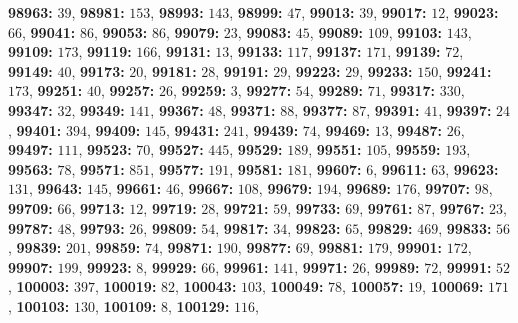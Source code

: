 \textsf{\bfseries 98963:} $39$, \textsf{\bfseries 98981:} $153$, \textsf{\bfseries 98993:} $143$, \textsf{\bfseries 98999:} $47$, \textsf{\bfseries 99013:} $39$, \textsf{\bfseries 99017:} $12$, \textsf{\bfseries 99023:} $66$, \textsf{\bfseries 99041:} $86$, \textsf{\bfseries 99053:} $86$, \textsf{\bfseries 99079:} $23$, \textsf{\bfseries 99083:} $45$, \textsf{\bfseries 99089:} $109$, \textsf{\bfseries 99103:} $143$, \textsf{\bfseries 99109:} $173$, \textsf{\bfseries 99119:} $166$, \textsf{\bfseries 99131:} $13$, \textsf{\bfseries 99133:} $117$, \textsf{\bfseries 99137:} $171$, \textsf{\bfseries 99139:} $72$, \textsf{\bfseries 99149:} $40$, \textsf{\bfseries 99173:} $20$, \textsf{\bfseries 99181:} $28$, \textsf{\bfseries 99191:} $29$, \textsf{\bfseries 99223:} $29$, \textsf{\bfseries 99233:} $150$, \textsf{\bfseries 99241:} $173$, \textsf{\bfseries 99251:} $40$, \textsf{\bfseries 99257:} $26$, \textsf{\bfseries 99259:} $3$, \textsf{\bfseries 99277:} $54$, \textsf{\bfseries 99289:} $71$, \textsf{\bfseries 99317:} $330$, \textsf{\bfseries 99347:} $32$, \textsf{\bfseries 99349:} $141$, \textsf{\bfseries 99367:} $48$, \textsf{\bfseries 99371:} $88$, \textsf{\bfseries 99377:} $87$, \textsf{\bfseries 99391:} $41$, \textsf{\bfseries 99397:} $24$, \textsf{\bfseries 99401:} $394$, \textsf{\bfseries 99409:} $145$, \textsf{\bfseries 99431:} $241$, \textsf{\bfseries 99439:} $74$, \textsf{\bfseries 99469:} $13$, \textsf{\bfseries 99487:} $26$, \textsf{\bfseries 99497:} $111$, \textsf{\bfseries 99523:} $70$, \textsf{\bfseries 99527:} $445$, \textsf{\bfseries 99529:} $189$, \textsf{\bfseries 99551:} $105$, \textsf{\bfseries 99559:} $193$, \textsf{\bfseries 99563:} $78$, \textsf{\bfseries 99571:} $851$, \textsf{\bfseries 99577:} $191$, \textsf{\bfseries 99581:} $181$, \textsf{\bfseries 99607:} $6$, \textsf{\bfseries 99611:} $63$, \textsf{\bfseries 99623:} $131$, \textsf{\bfseries 99643:} $145$, \textsf{\bfseries 99661:} $46$, \textsf{\bfseries 99667:} $108$, \textsf{\bfseries 99679:} $194$, \textsf{\bfseries 99689:} $176$, \textsf{\bfseries 99707:} $98$, \textsf{\bfseries 99709:} $66$, \textsf{\bfseries 99713:} $12$, \textsf{\bfseries 99719:} $28$, \textsf{\bfseries 99721:} $59$, \textsf{\bfseries 99733:} $69$, \textsf{\bfseries 99761:} $87$, \textsf{\bfseries 99767:} $23$, \textsf{\bfseries 99787:} $48$, \textsf{\bfseries 99793:} $26$, \textsf{\bfseries 99809:} $54$, \textsf{\bfseries 99817:} $34$, \textsf{\bfseries 99823:} $65$, \textsf{\bfseries 99829:} $469$, \textsf{\bfseries 99833:} $56$, \textsf{\bfseries 99839:} $201$, \textsf{\bfseries 99859:} $74$, \textsf{\bfseries 99871:} $190$, \textsf{\bfseries 99877:} $69$, \textsf{\bfseries 99881:} $179$, \textsf{\bfseries 99901:} $172$, \textsf{\bfseries 99907:} $199$, \textsf{\bfseries 99923:} $8$, \textsf{\bfseries 99929:} $66$, \textsf{\bfseries 99961:} $141$, \textsf{\bfseries 99971:} $26$, \textsf{\bfseries 99989:} $72$, \textsf{\bfseries 99991:} $52$, \textsf{\bfseries 100003:} $397$, \textsf{\bfseries 100019:} $82$, \textsf{\bfseries 100043:} $103$, \textsf{\bfseries 100049:} $78$, \textsf{\bfseries 100057:} $19$, \textsf{\bfseries 100069:} $171$, \textsf{\bfseries 100103:} $130$, \textsf{\bfseries 100109:} $8$, \textsf{\bfseries 100129:} $116$, 
